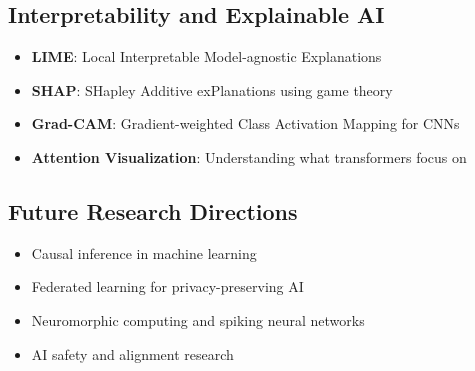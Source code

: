 \documentclass[11pt,letterpaper]{article}
\begin{document}
\subsection{Interpretability and Explainable AI}
\begin{itemize}
    \item \textbf{LIME}: Local Interpretable Model-agnostic Explanations
    \item \textbf{SHAP}: SHapley Additive exPlanations using game theory
    \item \textbf{Grad-CAM}: Gradient-weighted Class Activation Mapping for CNNs
    \item \textbf{Attention Visualization}: Understanding what transformers focus on
\end{itemize}

\subsection{Future Research Directions}
\begin{itemize}
    \item Causal inference in machine learning
    \item Federated learning for privacy-preserving AI
    \item Neuromorphic computing and spiking neural networks
    \item AI safety and alignment research
\end{itemize}

 
\end{document}
